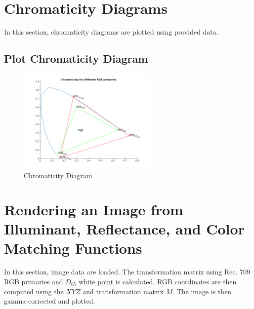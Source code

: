\documentclass{article}
\begin{document}
\section{Chromaticity Diagrams}
	In this section, chromaticity diagrams are plotted using provided data.

\subsection{Plot Chromaticity Diagram}
	\begin{figure}[h]
		\begin{center}
			\includegraphics[width=0.6\textwidth]{chromaticity.png}
			\caption{Chromaticity Diagram}
		\end{center}
	\end{figure}

\section{Rendering an Image from Illuminant, Reflectance, and Color Matching
		Functions}
	In this section, image data are loaded. The transformation matrix using
	Rec. 709 RGB primaries and $D_{65}$ white point is calculated. RGB
	coordinates are then computed using the $XYZ$ and transformation matrix $M$.
	The image is then gamma-corrected and plotted.
\end{document}
